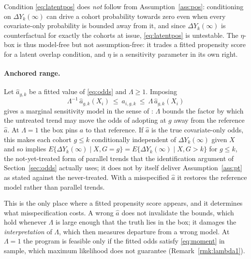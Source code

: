 \documentclass[12pt]{article}
\theoremstyle{remark}
\begin{document}
Condition \eqref{eq:latentpos} does \emph{not} follow from Assumption~\ref{ass:pos}:
conditioning on $\Delta Y_k(\infty)$ can drive a cohort probability towards zero even when
every covariate-only probability is bounded away from it, and since $\Delta Y_k(\infty)$ is
counterfactual for exactly the cohorts at issue, \eqref{eq:latentpos} is untestable. The
$\eta$-box is thus model-free but not assumption-free: it trades a fitted propensity score
for a latent overlap condition, and $\eta$ is a sensitivity parameter in its own right.

\paragraph{Anchored range.} Let $\widehat a_{g,k}$ be a fitted value of \eqref{eq:odds}
and $\Lambda \ge 1$. Imposing
\begin{equation}
\Lambda^{-1}\,\widehat a_{g,k}(X_i) \ \le\ a_{i,g,k} \ \le\ \Lambda\, \widehat a_{g,k}(X_i)
\label{eq:lambdabox}
\end{equation}
gives a marginal sensitivity model in the sense of \citet{tan2006distributional}:
$\Lambda$ bounds the factor by which the untreated trend may move the odds of adopting at
$g$ away from the reference $\widehat a$. At $\Lambda = 1$ the box pins $a$ to that
reference. If $\widehat a$ is the true covariate-only odds, this makes each cohort
$g \le k$ conditionally independent of $\Delta Y_k(\infty)$ given $X$ and so implies
$E\{\Delta Y_k(\infty) \mid X, G{=}g\} = E\{\Delta Y_k(\infty) \mid X, G{>}k\}$ for
$g \le k$, the not-yet-treated form of parallel trends that the identification argument of
Section~\ref{sec:odds} actually uses; it does not by itself deliver Assumption~\ref{ass:pt}
as stated against the never-treated. With a misspecified $\widehat a$ it restores the
reference model rather than parallel trends.

This is the only place where a fitted propensity score appears, and it determines what
misspecification costs. A wrong $\widehat a$ does not invalidate the bounds, which hold
whenever $\Lambda$ is large enough that the truth lies in the box; it damages the
\emph{interpretation} of $\Lambda$, which then measures departure from a wrong model. At
$\Lambda = 1$ the program is feasible only if the fitted odds satisfy \eqref{eq:moment} in
sample, which maximum likelihood does not guarantee (Remark~\ref{rmk:lambda1}).
\end{document}
